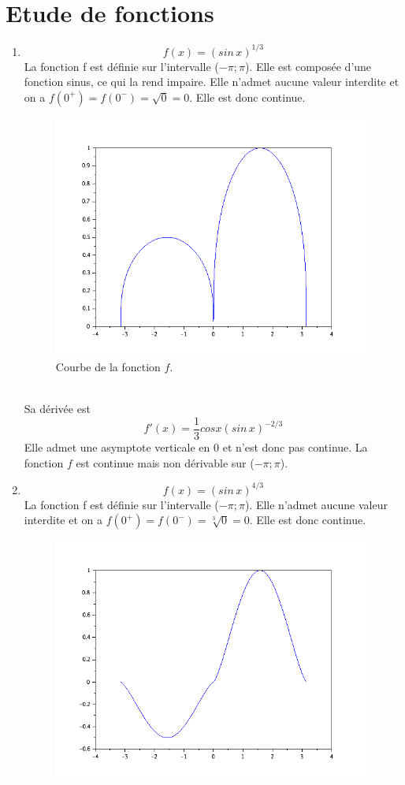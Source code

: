 \documentclass[a4paper,12pt]{report}
\begin{document}
\chapter{Etude de fonctions}
	\begin{enumerate}
	\item \[f(x)=(sin\,x)^{1/3}\]
	La fonction f est définie sur l'intervalle ($-\pi;\pi$). Elle est compos\'ee d'une fonction sinus, ce qui la rend impaire. Elle n'admet aucune valeur interdite et on a $f(0^+)=f(0^-)=\sqrt{0}=0$. Elle est donc continue.
	\begin{figure}[h!]
		\centering
		\includegraphics[scale=0.6]{ex2_fig1.png}
		\caption{\label{figure1}Courbe de la fonction $f$.}
		\end{figure}
		\\
	Sa d\'eriv\'ee est \[f'(x)=\frac{1}{3} cos x (sin\,x)^{-2/3}\] Elle admet une asymptote verticale en $0$ et n'est donc pas continue.
	La fonction $f$ est continue mais non d\'erivable sur ($-\pi;\pi$).
	\newpage
	\item \[f(x)=(sin\,x)^{4/3}\]
	La fonction f est définie sur l'intervalle ($-\pi;\pi$). Elle n'admet aucune valeur interdite et on a $f(0^+)=f(0^-)=\sqrt[3]{0}=0$. Elle est donc continue.
	\begin{figure}[h!]
		\centering
		\includegraphics[scale=0.6]{ex2_fig2.png}

\end{figure}
\end{enumerate}
\end{document}
